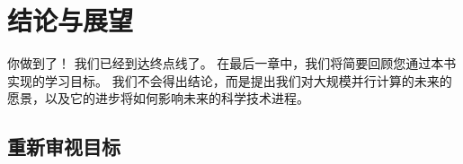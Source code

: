 \section{结论与展望}
你做到了！ 我们已经到达终点线了。 在最后一章中，我们将简要回顾您通过本书实现的学习目标。 我们不会得出结论，而是提出我们对大规模并行计算的未来的愿景，以及它的进步将如何影响未来的科学技术进程。

\subsection{重新审视目标}
